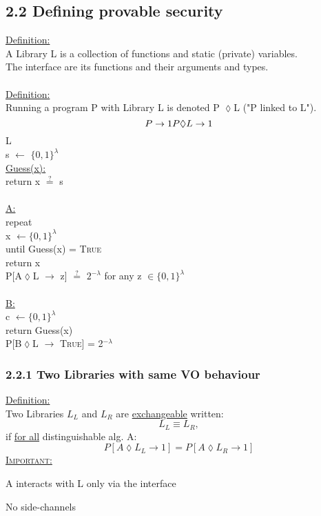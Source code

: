 \documentclass{report}
\begin{document}
 \subsection*{2.2 Defining provable security}
 \underline{Definition:} \\
 A Library L is a collection of functions and static (private) variables. \\
 The interface are its functions and their arguments and types. \\ \\
 \underline{Definition:} \\
 Running a program P with Library L is denoted P $\lozenge$L ("P linked to L"). \\
 \[
 	P \rightarrow 1 $$ $$
 	P \lozenge L \rightarrow 1
 \]
 L \\
 s $\leftarrow$ $\{0,1\} ^{\lambda}$ \\
 \underline{Guess(x):} \\
 return x $\stackrel{?}{=}$ s \\ \\
 \underline{A:} \\
 repeat \\
 x $\leftarrow \{0,1\}^{\lambda}$ \\
 until Guess(x) = \textsc{True} \\
 return x \\
 P[A$\lozenge$L $\rightarrow$ z] $\stackrel{?}{=}$ $2^{-\lambda}$ for any z $\in \{0,1\}^{\lambda}$ \\ \\
 \underline{B:} \\
 c $\leftarrow \{0,1\} ^{\lambda}$ \\
 return Guess(x) \\
 P[B$\lozenge $L $\rightarrow $ \textsc{True}] = 2$^{-\lambda}$
 \subsubsection*{2.2.1 Two Libraries with same VO behaviour}
 \underline{Definition:} \\
 Two Libraries $L_L$ and $L_R$ are \underline{exchangeable} written:
 \[
 	L_L \equiv L_R,
 \]
 if \underline{for all} distinguishable alg. A:
 \[
 	P[A \lozenge L_L \rightarrow 1] = P[A \lozenge L_R \rightarrow 1]
 \]
 \underline{\textsc{Important:}}
 \begin{compactenum}[-]
 	\item A interacts with L only via the interface
 	\item No side-channels
 \end{compactenum}
\end{document}

